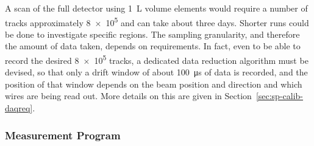A scan of the full detector using \SI{1}{L} volume elements would require a number of tracks approximately \num{8e5} 
and can take about three days. Shorter runs could be done to investigate specific regions. The sampling granularity, and therefore the amount of data taken, depends on  requirements. In fact, even to be able to record the desired \num{8e5} tracks, a dedicated data reduction algorithm must be devised, so that only a drift window of about \SI{100}{\micro\s}
of data is recorded, and the position of that window depends on the beam position and direction and which wires are being read out. More details on this are given in Section~\ref{sec:sp-calib-daqreq}.






\subsubsection{Measurement Program}
\label{sec:sp-calib-sys-las-ion-meas}


